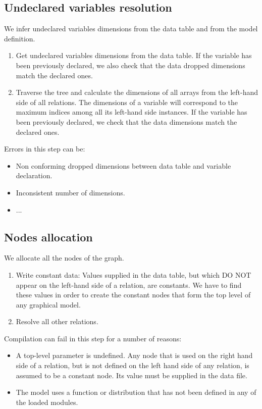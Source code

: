 \documentclass[11pt, a4paper, titlepage]{report}
\begin{document}
\subsection{Undeclared variables resolution}
We infer undeclared variables dimensions from the data table and from the model definition.
 \begin{enumerate}
 \item Get undeclared variables dimensions from the data table. If the variable has been previously declared, we also check that the data dropped dimensions match the declared ones.
 \item Traverse the tree and calculate the dimensions of all arrays from the left-hand side of all relations. The dimensions of a variable will correspond to the maximum indices among all its left-hand side instances. If the variable has been previously declared, we check that the data dimensions match the declared ones.
 \end{enumerate}
  Errors in this step can be:
  \begin{itemize}
  \item Non conforming dropped dimensions between data table and variable declaration.
  \item Inconsistent number of dimensions.
  \item ...
  \end{itemize}
  
\subsection{Nodes allocation}
We allocate all the nodes of the graph.
 \begin{enumerate}
 \item Write constant data: Values supplied in the data table, but which DO NOT appear on the left-hand side of a relation, are constants. We have to find these values in order to create the constant nodes that form the top level of any graphical model.
 \item Resolve all other relations.
 \end{enumerate}
 Compilation can fail in this step for a number of reasons:
 \begin{itemize}
 \item A top-level parameter is undefined. Any node that is used on
 the right hand side of a relation, but is not defined on the left
 hand side of any relation, is assumed to be a constant node. Its value must be supplied in the data file. 
 \item The model uses a function or distribution that has not been
 defined in any of the loaded modules.
 \end{itemize}
 
\end{document}
